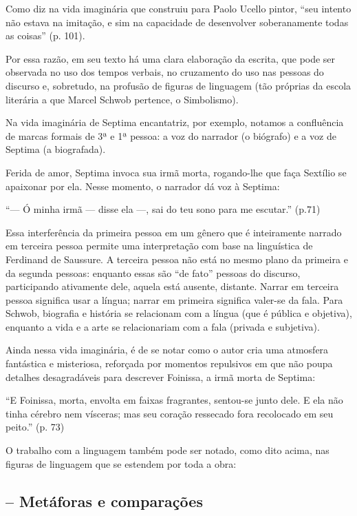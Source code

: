 \documentclass[12pt]{extarticle}
\begin{document}
Como diz na vida imaginária que construiu para Paolo Ucello pintor,
``seu intento não estava na imitação, e sim na capacidade de desenvolver
soberanamente todas as coisas'' (p. 101).

Por essa razão, em seu texto há uma clara elaboração da escrita, que
pode ser observada no uso dos tempos verbais, no cruzamento do uso nas
pessoas do discurso e, sobretudo, na profusão de figuras de linguagem
(tão próprias da escola literária a que Marcel Schwob pertence, o
Simbolismo).

Na vida imaginária de Septima encantatriz, por exemplo, notamos a
confluência de marcas formais de 3ª e 1ª pessoa: a voz do narrador (o
biógrafo) e a voz de Septima (a biografada).

Ferida de amor, Septima invoca sua irmã morta, rogando-lhe que faça
Sextílio se apaixonar por ela. Nesse momento, o narrador dá voz à
Septima:

``--- Ó minha irmã --- disse ela ---, sai do teu sono para me escutar.''
(p.71)

Essa interferência da primeira pessoa em um gênero que é inteiramente
narrado em terceira pessoa permite uma interpretação com base na
linguística de Ferdinand de Saussure. A terceira pessoa não está no
mesmo plano da primeira e da segunda pessoas: enquanto essas são ``de
fato'' pessoas do discurso, participando ativamente dele, aquela está
ausente, distante. Narrar em terceira pessoa significa usar a língua;
narrar em primeira significa valer-se da fala. Para Schwob, biografia e
história se relacionam com a língua (que é pública e objetiva), enquanto
a vida e a arte se relacionariam com a fala (privada e subjetiva).

Ainda nessa vida imaginária, é de se notar como o autor cria uma
atmosfera fantástica e misteriosa, reforçada por momentos repulsivos em
que não poupa detalhes desagradáveis para descrever Foinissa, a irmã
morta de Septima:

``E Foinissa, morta, envolta em faixas fragrantes, sentou-se junto dele.
E ela não tinha cérebro nem vísceras; mas seu coração ressecado fora
recolocado em seu peito.'' (p. 73)

O trabalho com a linguagem também pode ser notado, como dito acima, nas
figuras de linguagem que se estendem por toda a obra:


\subsection{-- Metáforas e comparações}
\end{document}
